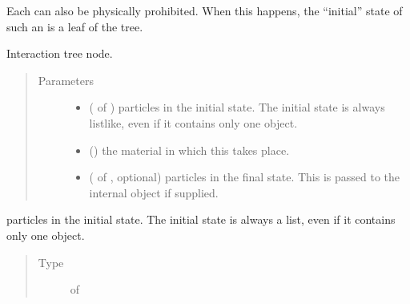 \documentclass[letterpaper,10pt,english]{sphinxmanual}
\begin{document}
Each  can also be physically prohibited. When this happens,
the “initial” state of such an  is a leaf of the tree.

\begin{fulllineitems}
\label{\detokenize{code_structure:scdc.event.Event}}
Interaction tree node.
\begin{quote}\begin{description}
\item[{Parameters}] \leavevmode\begin{itemize}
\item {} 
 ( of ) \textendash{} particles in the
initial state. The initial state is always listlike, even if it
contains only one object.

\item {} 
 () \textendash{} the material in which this takes place.

\item {} 
 ( of , optional) \textendash{} particles in
the final state. This is passed to the internal 
object if supplied.

\end{itemize}

\end{description}\end{quote}

\begin{fulllineitems}
\label{\detokenize{code_structure:scdc.event.Event.initial_state}}
particles in the
initial state. The initial state is always a list, even if it
contains only one object.
\begin{quote}\begin{description}
\item[{Type}] \leavevmode
{} of 


\end{description}
\end{quote}
\end{fulllineitems}
\end{fulllineitems}
\end{document}
